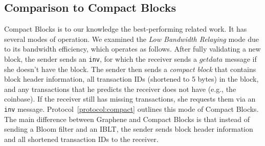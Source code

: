 \subsection{Comparison to Compact Blocks} 
Compact Blocks\cite{Corallo:2016} is to our knowledge the best-performing related work. It has several modes of operation. 
We examined the  \textit{Low Bandwidth
  Relaying} mode due to its bandwidth efficiency, which operates as follows. 
After fully
validating a new block, the sender sends an {\tt inv}, for which the receiver sends a $getdata$ message if she
doesn't have the block. The sender then sends a \textit{compact block}
that contains block header information, all  transaction IDs (shortened to 5 bytes)
in the block, and any transactions that he predicts the receiver does
not have (e.g., the coinbase). If the receiver still has missing transactions, she requests
them via an {\tt inv} message. Protocol~\ref{protocol:compact} outlines
this  mode of Compact Blocks. The main difference between Graphene and Compact Blocks is that instead of
sending a Bloom filter and an IBLT, the sender sends block header
information and all shortened transaction IDs to the receiver. 
 



